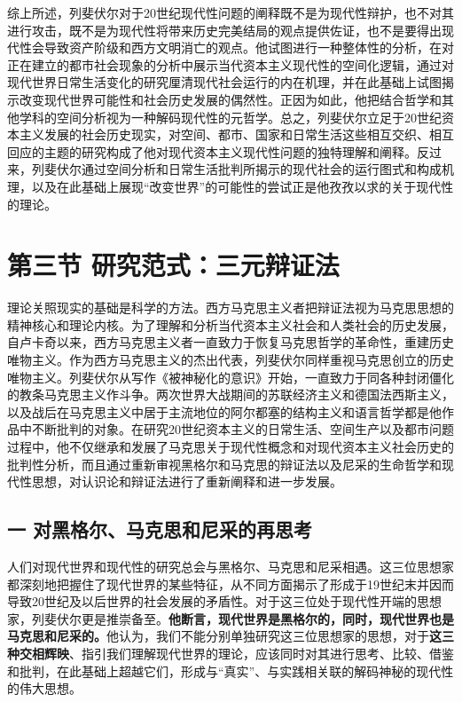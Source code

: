 \documentclass[UTF8, fontset = sourcesans, a4paper, oneside, zihao =
-4, scheme=chinese, no-math, space=true]{ctexbook}
\begin{document}
综上所述，列斐伏尔对于20世纪现代性问题的阐释既不是为现代性辩护，也不对其进行攻击，既不是为现代性将带来历史完美结局的观点提供佐证，也不是要得出现代性会导致资产阶级和西方文明消亡的观点。他试图进行一种整体性的分析，在对正在建立的都市社会现象的分析中展示当代资本主义现代性的空间化逻辑，通过对现代世界日常生活变化的研究厘清现代社会运行的内在机理，并在此基础上试图揭示改变现代世界可能性和社会历史发展的偶然性。正因为如此，他把结合哲学和其他学科的空间分析视为一种解码现代性的元哲学。总之，列斐伏尔立足于20世纪资本主义发展的社会历史现实，对空间、都市、国家和日常生活这些相互交织、相互回应的主题的研究构成了他对现代资本主义现代性问题的独特理解和阐释。反过来，列斐伏尔通过空间分析和日常生活批判所揭示的现代社会的运行图式和构成机理，以及在此基础上展现``改变世界''的可能性的尝试正是他孜孜以求的关于现代性的理论。

\protect\hypertarget{part0005_split_003.html}{}{}

\hypertarget{part0005_split_003.htmlux5cux23b003}{\section{第三节
研究范式：三元辩证法}\label{part0005_split_003.htmlux5cux23b003}}

理论关照现实的基础是科学的方法。西方马克思主义者把辩证法视为马克思思想的精神核心和理论内核。为了理解和分析当代资本主义社会和人类社会的历史发展，自卢卡奇以来，西方马克思主义者一直致力于恢复马克思哲学的革命性，重建历史唯物主义。作为西方马克思主义的杰出代表，列斐伏尔同样重视马克思创立的历史唯物主义。列斐伏尔从写作《被神秘化的意识》开始，一直致力于同各种封闭僵化的教条马克思主义作斗争。两次世界大战期间的苏联经济主义和德国法西斯主义，以及战后在马克思主义中居于主流地位的阿尔都塞的结构主义和语言哲学都是他作品中不断批判的对象。在研究20世纪资本主义的日常生活、空间生产以及都市问题过程中，他不仅继承和发展了马克思关于现代性概念和对现代资本主义社会历史的批判性分析，而且通过重新审视黑格尔和马克思的辩证法以及尼采的生命哲学和现代性思想，对认识论和辩证法进行了重新阐释和进一步发展。

\subsection{一
对黑格尔、马克思和尼采的再思考}\label{part0005_split_003.htmlux5cux23c010}

人们对现代世界和现代性的研究总会与黑格尔、马克思和尼采相遇。这三位思想家都深刻地把握住了现代世界的某些特征，从不同方面揭示了形成于19世纪末并因而导致20世纪及以后世界的社会发展的矛盾性。对于这三位处于现代性开端的思想家，列斐伏尔更是推崇备至。\textbf{他断言，现代世界是黑格尔的，同时，现代世界也是马克思和尼采的。}他认为，我们不能分别单独研究这三位思想家的思想，对于\textbf{这三种交相辉映}、指引我们理解现代世界的理论，应该同时对其进行思考、比较、借鉴和批判，在此基础上超越它们，形成与``真实''、与实践相关联的解码神秘的现代性的伟大思想。
\end{document}
